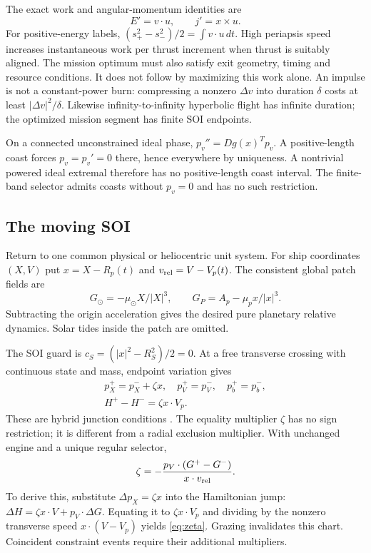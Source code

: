 The exact work and angular-momentum identities are
\begin{equation}
 E'=v\cdot u,\qquad j'=x\times u.
 \label{eq:work}
\end{equation}
For positive-energy labels,
$(s_+^2-s_-^2)/2=\int v\cdot u\,dt$.
High periapsis speed increases instantaneous work per thrust increment
when thrust is suitably aligned. The mission optimum must also satisfy
exit geometry, timing and resource conditions. It does not follow by
maximizing this work alone.
An impulse is not a constant-power burn: compressing a nonzero
$\Delta v$ into duration $\delta$ costs at least $|\Delta v|^2/\delta$.
Likewise infinity-to-infinity hyperbolic flight has infinite duration;
the optimized mission segment has finite SOI endpoints.

On a connected unconstrained ideal phase,
$p_v''=Dg(x)^Tp_v$. A positive-length coast forces $p_v=p_v'=0$
there, hence everywhere by uniqueness. A nontrivial powered ideal
extremal therefore has no positive-length coast interval.
The finite-band selector admits coasts without $p_v=0$ and has no such
restriction.

\subsection{The moving SOI}
Return to one common physical or heliocentric unit system.
For ship coordinates $(X,V)$ put $x=X-R_p(t)$ and
$v_{\rm rel}=V-V_p(t)$. The consistent global patch fields are
\begin{equation}
 G_\odot=-\mu_\odot X/|X|^3,\qquad
 G_P=A_p-\mu_p x/|x|^3.
 \label{eq:fields}
\end{equation}
Subtracting the origin acceleration gives the desired pure planetary
relative dynamics. Solar tides inside the patch are omitted.

The SOI guard is $c_S=(|x|^2-R_S^2)/2=0$. At a free transverse
crossing with continuous state and mass, endpoint variation gives
\begin{equation}
 \begin{gathered}
 p_X^+=p_X^-+\zeta x,\quad
 p_V^+=p_V^-,\quad p_b^+=p_b^-,\\
 H^+-H^-=\zeta x\cdot V_p.
 \end{gathered}
 \label{eq:soijump}
\end{equation}
These are hybrid junction conditions \cite{PakniyatCaines2021}.
The equality multiplier $\zeta$ has no sign restriction; it is different
from a radial exclusion multiplier. With unchanged engine and a unique
regular selector,
\begin{equation}
 \zeta=-\frac{p_V\cdot(G^+-G^-)}{x\cdot v_{\rm rel}}.
 \label{eq:zeta}
\end{equation}
To derive this, substitute $\Delta p_X=\zeta x$ into the Hamiltonian
jump: $\Delta H=\zeta x\cdot V+p_V\cdot\Delta G$.
Equating it to $\zeta x\cdot V_p$ and dividing by the nonzero transverse
speed $x\cdot(V-V_p)$ yields \eqref{eq:zeta}.
Grazing invalidates this chart. Coincident constraint events require
their additional multipliers.

